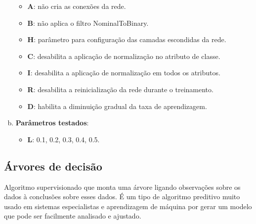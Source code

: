 \begin{enumerate}[a)]
\begin{itemize}

            \item \textbf{A}: não cria as conexões da rede.

            \item \textbf{B}: não aplica o filtro NominalToBinary.

            \item \textbf{H}: parâmetro para configuração das camadas escondidas da rede.

            \item \textbf{C}: desabilita a aplicação de normalização no atributo de classe.

            \item \textbf{I}: desabilita a aplicação de normalização em todos os atributos.

            \item \textbf{R}: desabilita a reinicialização da rede durante o treinamento.

            \item \textbf{D}: habilita a diminuição gradual da taxa de aprendizagem.
        \end{itemize}
    \item \textbf{Parâmetros testados}:
        \begin{itemize}
            \item \textbf{L}: 0.1, 0.2, 0.3, 0.4, 0.5.
        \end{itemize}
\end{enumerate}

\subsection{Árvores de decisão}

Algoritmo supervisionado que monta uma árvore ligando observações sobre os dados à conclusões sobre esses dados. É um tipo de algoritmo preditivo muito usado em sistemas especialistas e aprendizagem de máquina por gerar um modelo que pode ser facilmente analisado e ajustado.

